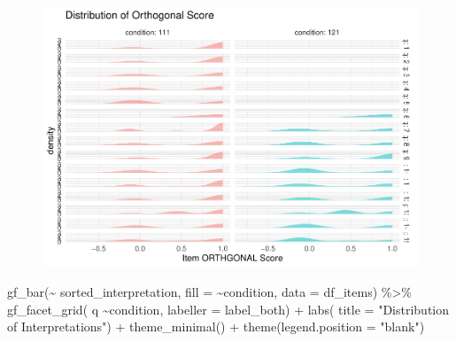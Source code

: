 \documentclass[
  letterpaper,
  DIV=11,
  numbers=noendperiod]{scrreprt}
\newenvironment{Shaded}{\begin{snugshade}}{\end{snugshade}}
\newcommand{\AttributeTok}[1]{\textcolor[rgb]{0.40,0.45,0.13}{#1}}
\newcommand{\FunctionTok}[1]{\textcolor[rgb]{0.28,0.35,0.67}{#1}}
\newcommand{\NormalTok}[1]{\textcolor[rgb]{0.00,0.23,0.31}{#1}}
\newcommand{\SpecialCharTok}[1]{\textcolor[rgb]{0.37,0.37,0.37}{#1}}
\newcommand{\StringTok}[1]{\textcolor[rgb]{0.13,0.47,0.30}{#1}}
\begin{document}
\begin{figure}[H]

{\centering \includegraphics{analysis/SGC3A/2_sgc3A_scoring_files/figure-pdf/unnamed-chunk-83-3.pdf}

}

\end{figure}

\begin{Shaded}
\begin{Highlighting}[]
\FunctionTok{gf\_bar}\NormalTok{(}\SpecialCharTok{\textasciitilde{}}\NormalTok{ sorted\_interpretation, }\AttributeTok{fill =} \SpecialCharTok{\textasciitilde{}}\NormalTok{condition, }\AttributeTok{data =}\NormalTok{ df\_items) }\SpecialCharTok{\%\textgreater{}\%} 
  \FunctionTok{gf\_facet\_grid}\NormalTok{( q }\SpecialCharTok{\textasciitilde{}}\NormalTok{condition, }\AttributeTok{labeller =}\NormalTok{ label\_both) }\SpecialCharTok{+} 
  \FunctionTok{labs}\NormalTok{( }\AttributeTok{title =} \StringTok{"Distribution of Interpretations"}\NormalTok{) }\SpecialCharTok{+} \FunctionTok{theme\_minimal}\NormalTok{() }\SpecialCharTok{+} \FunctionTok{theme}\NormalTok{(}\AttributeTok{legend.position =} \StringTok{"blank"}\NormalTok{)}
\end{Highlighting}
\end{Shaded}
\end{document}
